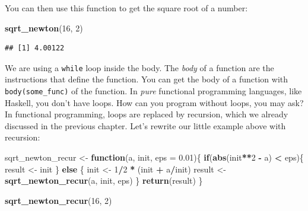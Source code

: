 \documentclass[]{gitbook}
\newenvironment{Shaded}{\begin{snugshade}}{\end{snugshade}}
\newcommand{\ControlFlowTok}[1]{\textcolor[rgb]{0.13,0.29,0.53}{\textbf{#1}}}
\newcommand{\DataTypeTok}[1]{\textcolor[rgb]{0.13,0.29,0.53}{#1}}
\newcommand{\DecValTok}[1]{\textcolor[rgb]{0.00,0.00,0.81}{#1}}
\newcommand{\FloatTok}[1]{\textcolor[rgb]{0.00,0.00,0.81}{#1}}
\newcommand{\KeywordTok}[1]{\textcolor[rgb]{0.13,0.29,0.53}{\textbf{#1}}}
\newcommand{\NormalTok}[1]{#1}
\newcommand{\OperatorTok}[1]{\textcolor[rgb]{0.81,0.36,0.00}{\textbf{#1}}}
\newcommand{\StringTok}[1]{\textcolor[rgb]{0.31,0.60,0.02}{#1}}
\begin{document}
You can then use this function to get the square root of a number:

\begin{Shaded}
\begin{Highlighting}[]
\KeywordTok{sqrt_newton}\NormalTok{(}\DecValTok{16}\NormalTok{, }\DecValTok{2}\NormalTok{)}
\end{Highlighting}
\end{Shaded}

\begin{verbatim}
## [1] 4.00122
\end{verbatim}

We are using a \texttt{while} loop inside the body. The \emph{body} of a function are the instructions that
define the function. You can get the body of a function with \texttt{body(some\_func)} of the function.
In \emph{pure} functional programming languages, like Haskell, you don't have loops. How can you
program without loops, you may ask? In functional programming, loops are replaced by recursion,
which we already discussed in the previous chapter. Let's rewrite our little example above
with recursion:

\begin{Shaded}
\begin{Highlighting}[]
\NormalTok{sqrt_newton_recur <-}\StringTok{ }\ControlFlowTok{function}\NormalTok{(a, init, }\DataTypeTok{eps =} \FloatTok{0.01}\NormalTok{)\{}
    \ControlFlowTok{if}\NormalTok{(}\KeywordTok{abs}\NormalTok{(init}\OperatorTok{**}\DecValTok{2} \OperatorTok{-}\StringTok{ }\NormalTok{a) }\OperatorTok{<}\StringTok{ }\NormalTok{eps)\{}
\NormalTok{        result <-}\StringTok{ }\NormalTok{init}
\NormalTok{    \} }\ControlFlowTok{else}\NormalTok{ \{}
\NormalTok{        init <-}\StringTok{ }\DecValTok{1}\OperatorTok{/}\DecValTok{2} \OperatorTok{*}\StringTok{ }\NormalTok{(init }\OperatorTok{+}\StringTok{ }\NormalTok{a}\OperatorTok{/}\NormalTok{init)}
\NormalTok{        result <-}\StringTok{ }\KeywordTok{sqrt_newton_recur}\NormalTok{(a, init, eps)}
\NormalTok{    \}}
    \KeywordTok{return}\NormalTok{(result)}
\NormalTok{\}}
\end{Highlighting}
\end{Shaded}

\begin{Shaded}
\begin{Highlighting}[]
\KeywordTok{sqrt_newton_recur}\NormalTok{(}\DecValTok{16}\NormalTok{, }\DecValTok{2}\NormalTok{)}
\end{Highlighting}
\end{Shaded}
\end{document}
